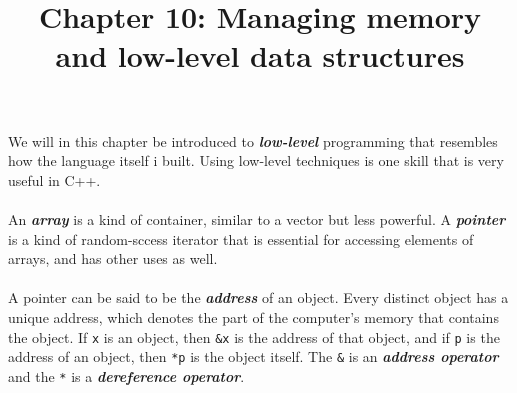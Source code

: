 \documentclass[12p, a4paper]{article}
\title{Chapter 10: Managing memory and low-level data structures}
\begin{document}
\maketitle
We will in this chapter be introduced to \textbf{\textit{low-level}} programming that resembles how the language itself i built. Using low-level techniques is one skill that is very useful in C++.\\
\\

An \textbf{\textit{array}} is a kind of container, similar to a vector but less powerful. A \textbf{\textit{pointer}} is a kind of random-sccess iterator that is essential for accessing elements of arrays, and has other uses as well. \\
\\

A pointer can be said to be the \textbf{\textit{address}} of an object. Every distinct object has a unique address, which denotes the part of the computer's memory that contains the object. If \texttt{x} is an object, then \texttt{\&x} is the address of that object, and if \texttt{p} is the address of an object, then \texttt{*p} is the object itself. The \texttt{\&} is an \textbf{\textit{address operator}} and the \texttt{*} is a \textbf{\textit{dereference operator}}.
\end{document}
